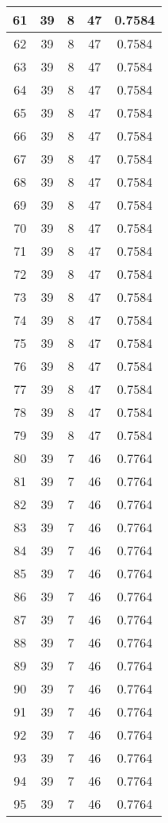 \documentclass[letterpaper, 12pt]{article}
\begin{document}
\begin{longtable}{|c|c|c|c|c|}
61 & 39 & 8 & 47 & 0.7584 \\
\hline
62 & 39 & 8 & 47 & 0.7584 \\
\hline
63 & 39 & 8 & 47 & 0.7584 \\
\hline
64 & 39 & 8 & 47 & 0.7584 \\
\hline
65 & 39 & 8 & 47 & 0.7584 \\
\hline
66 & 39 & 8 & 47 & 0.7584 \\
\hline
67 & 39 & 8 & 47 & 0.7584 \\
\hline
68 & 39 & 8 & 47 & 0.7584 \\
\hline
69 & 39 & 8 & 47 & 0.7584 \\
\hline
70 & 39 & 8 & 47 & 0.7584 \\
\hline
71 & 39 & 8 & 47 & 0.7584 \\
\hline
72 & 39 & 8 & 47 & 0.7584 \\
\hline
73 & 39 & 8 & 47 & 0.7584 \\
\hline
74 & 39 & 8 & 47 & 0.7584 \\
\hline
75 & 39 & 8 & 47 & 0.7584 \\
\hline
76 & 39 & 8 & 47 & 0.7584 \\
\hline
77 & 39 & 8 & 47 & 0.7584 \\
\hline
78 & 39 & 8 & 47 & 0.7584 \\
\hline
79 & 39 & 8 & 47 & 0.7584 \\
\hline
80 & 39 & 7 & 46 & 0.7764 \\
\hline
81 & 39 & 7 & 46 & 0.7764 \\
\hline
82 & 39 & 7 & 46 & 0.7764 \\
\hline
83 & 39 & 7 & 46 & 0.7764 \\
\hline
84 & 39 & 7 & 46 & 0.7764 \\
\hline
85 & 39 & 7 & 46 & 0.7764 \\
\hline
86 & 39 & 7 & 46 & 0.7764 \\
\hline
87 & 39 & 7 & 46 & 0.7764 \\
\hline
88 & 39 & 7 & 46 & 0.7764 \\
\hline
89 & 39 & 7 & 46 & 0.7764 \\
\hline
90 & 39 & 7 & 46 & 0.7764 \\
\hline
91 & 39 & 7 & 46 & 0.7764 \\
\hline
92 & 39 & 7 & 46 & 0.7764 \\
\hline
93 & 39 & 7 & 46 & 0.7764 \\
\hline
94 & 39 & 7 & 46 & 0.7764 \\
\hline
95 & 39 & 7 & 46 & 0.7764 \\

\end{longtable}
\end{document}
